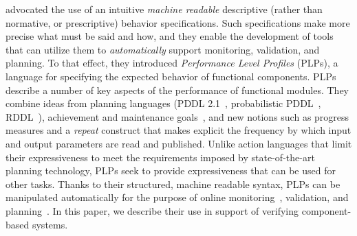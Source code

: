 \documentclass[letterpaper]{article}
\begin{document}
\citet{PLP-IROS16} advocated the use of an intuitive {\em machine readable\/} descriptive (rather than normative, or prescriptive) behavior specifications. Such specifications make more precise what must be said and how, 
and they enable the development of tools that can utilize them to {\em automatically\/} support monitoring, validation, and planning.  
%
To that effect, they introduced {\em Performance Level Profiles} (PLPs), a language for specifying the expected behavior of functional components. 
PLPs describe a number of key aspects of the performance of functional modules. They combine ideas from planning languages (PDDL 2.1~\citep{PDDL2.1}, probabilistic PDDL~\citep{YouLit04}, RDDL~\citep{RDDL}), achievement and maintenance goals~\citep{PRS, aamas07maint}, and new notions such as progress measures and a {\em repeat\/} construct that makes explicit the frequency by which input and
output parameters are read and published. Unlike action languages that limit their expressiveness to meet the requirements imposed by state-of-the-art planning technology, PLPs seek to provide expressiveness that can be used for other tasks.
%
Thanks to their structured, machine readable syntax, PLPs can be manipulated automatically for the purpose of online monitoring~\citep{PLP-IROS16}, validation, and planning~\citep{PlanRob16}. In this paper, we describe their use in support of verifying component-based systems.

\end{document}
